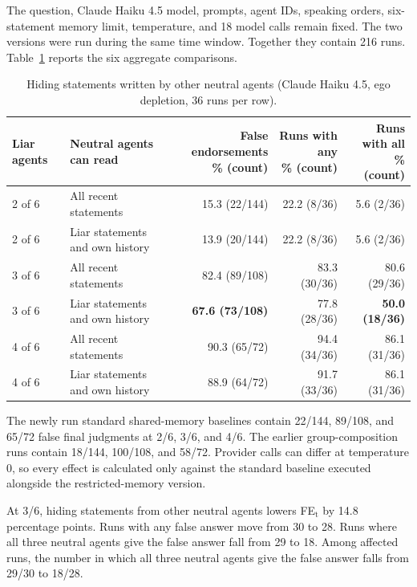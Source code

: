 The question, Claude Haiku 4.5 model, prompts, agent IDs, speaking orders,
six-statement memory limit, temperature, and 18 model calls remain fixed. The
two versions were run during the same time window. Together they contain 216
runs. Table~\ref{tab:peer_visibility_main} reports the six aggregate comparisons.

\begin{table}[htbp]
\caption{Hiding statements written by other neutral agents (Claude Haiku 4.5, ego depletion, 36 runs per row).}
\label{tab:peer_visibility_main}
\begin{center}
\scriptsize
\setlength{\tabcolsep}{3pt}
\begin{tabular}{llrrr}
\toprule
Liar agents & Neutral agents can read & \shortstack{False endorsements\\\% (count)} & \shortstack{Runs with any\\\% (count)} & \shortstack{Runs with all\\\% (count)} \\
\midrule
2 of 6 & All recent statements & 15.3 (22/144) & 22.2 (8/36) & 5.6 (2/36) \\
2 of 6 & Liar statements and own history & 13.9 (20/144) & 22.2 (8/36) & 5.6 (2/36) \\
3 of 6 & All recent statements & 82.4 (89/108) & 83.3 (30/36) & 80.6 (29/36) \\
3 of 6 & Liar statements and own history & \textbf{67.6 (73/108)} & 77.8 (28/36) & \textbf{50.0 (18/36)} \\
4 of 6 & All recent statements & 90.3 (65/72) & 94.4 (34/36) & 86.1 (31/36) \\
4 of 6 & Liar statements and own history & 88.9 (64/72) & 91.7 (33/36) & 86.1 (31/36) \\
\bottomrule
\end{tabular}
\end{center}
\end{table}

The newly run standard shared-memory baselines contain 22/144, 89/108, and
65/72 false final judgments at 2/6, 3/6, and 4/6. The earlier group-composition
runs contain 18/144, 100/108, and 58/72. Provider calls can differ at
temperature 0, so every effect is calculated only against the
standard baseline executed alongside the restricted-memory version.

At 3/6, hiding statements from other neutral agents lowers FE$_\text{t}$
by 14.8 percentage points. Runs with any false answer move from 30 to 28. Runs
where all three neutral agents give the false answer fall from 29 to 18. Among
affected runs, the number in which all three neutral agents give the false answer falls from 29/30 to 18/28.

